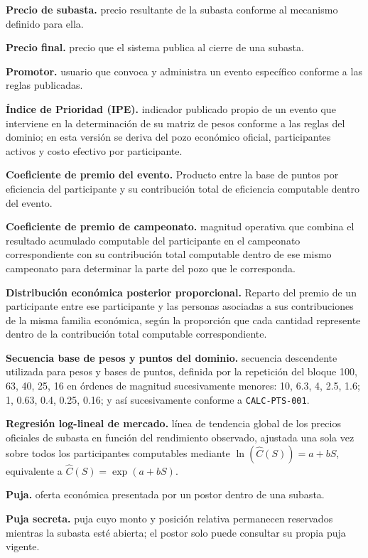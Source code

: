 \documentclass[10pt,letterpaper]{article}
\begin{document}
\noindent\textbf{Precio de subasta.} precio resultante de la subasta conforme al mecanismo definido para ella.\par
\noindent\textbf{Precio final.} precio que el sistema publica al cierre de una subasta.\par
\noindent\textbf{Promotor.} usuario que convoca y administra un evento específico conforme a las reglas publicadas.\par
\noindent\textbf{Índice de Prioridad (IPE).} indicador publicado propio de un evento que interviene en la determinación de su matriz de pesos conforme a las reglas del dominio; en esta versión se deriva del pozo económico oficial, participantes activos y costo efectivo por participante.\par
\noindent\textbf{Coeficiente de premio del evento.} Producto entre la base de puntos por eficiencia del participante y su contribución total de eficiencia computable dentro del evento.\par
\noindent\textbf{Coeficiente de premio de campeonato.} magnitud operativa que combina el resultado acumulado computable del participante en el campeonato correspondiente con su contribución total computable dentro de ese mismo campeonato para determinar la parte del pozo que le corresponda.\par
\noindent\textbf{Distribución económica posterior proporcional.} Reparto del premio de un participante entre ese participante y las personas asociadas a sus contribuciones de la misma familia económica, según la proporción que cada cantidad represente dentro de la contribución total computable correspondiente.\par
\noindent\textbf{Secuencia base de pesos y puntos del dominio.} secuencia descendente utilizada para pesos y bases de puntos, definida por la repetición del bloque 100, 63, 40, 25, 16 en órdenes de magnitud sucesivamente menores: 10, 6.3, 4, 2.5, 1.6; 1, 0.63, 0.4, 0.25, 0.16; y así sucesivamente conforme a \texttt{CALC-PTS-001}.\par
\noindent\textbf{Regresión log-lineal de mercado.} línea de tendencia global de los precios oficiales de subasta en función del rendimiento observado, ajustada una sola vez sobre todos los participantes computables mediante $\ln(\widehat C(S))=a+bS$, equivalente a $\widehat C(S)=\exp(a+bS)$.\par
\noindent\textbf{Puja.} oferta económica presentada por un postor dentro de una subasta.\par
\noindent\textbf{Puja secreta.} puja cuyo monto y posición relativa permanecen reservados mientras la subasta esté abierta; el postor solo puede consultar su propia puja vigente.\par
\end{document}
